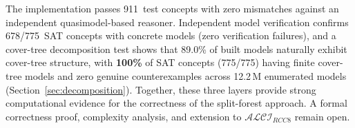 \documentclass[a4paper,11pt]{article}
\theoremstyle{definition}
\newcommand{\ALCIRCC}[1]{\ensuremath{\mathcal{ALCI}_{\mathit{RCC#1}}}}
\begin{document}
The implementation passes 911~test concepts with zero mismatches
against an independent quasimodel-based reasoner.  Independent model
verification confirms 678/775~SAT concepts with concrete models
(zero verification failures), and a cover-tree decomposition test
shows that 89.0\% of built models naturally exhibit cover-tree
structure, with \textbf{100\%} of SAT concepts (775/775) having finite
cover-tree models and zero genuine counterexamples across
12.2\,M enumerated models (Section~\ref{sec:decomposition}).
Together, these three
layers provide strong computational evidence for the correctness of
the split-forest approach.  A formal correctness proof, complexity
analysis, and extension to $\ALCIRCC{8}$ remain open.


\end{document}
